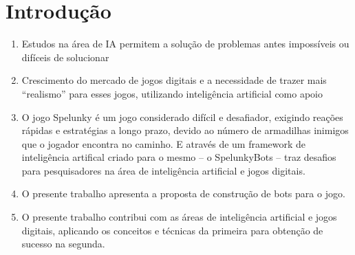 \chapter{\label{chap:intro}Introdução}

\begin{enumerate}
    \item Estudos na área de IA permitem a solução de problemas antes
        impossíveis ou difíceis de solucionar
    \item Crescimento do mercado de jogos digitais e a necessidade de trazer
        mais ``realismo'' para esses jogos, utilizando inteligência artificial
        como apoio
    \item O jogo Spelunky é um jogo considerado difícil e desafiador, exigindo
        reações rápidas e estratégias a longo prazo, devido ao número de
        armadilhas inimigos que o jogador encontra no caminho. E através de um 
        framework de inteligência artifical criado para o mesmo -- o
        SpelunkyBots -- traz desafios para pesquisadores na área de inteligência
        artificial e jogos digitais.
    \item O presente trabalho apresenta a proposta de construção de bots para o
        jogo.
    \item O presente trabalho contribui com as áreas de inteligência artificial
        e jogos digitais, aplicando os conceitos e técnicas da primeira para
        obtenção de sucesso na segunda.
\end{enumerate}
